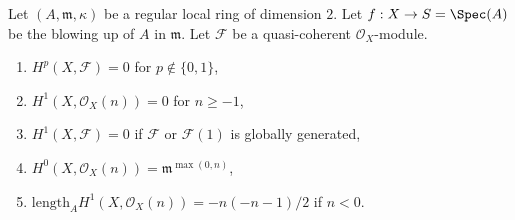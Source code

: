 \begin{lemma}
\label{lemma-cohomology-of-blowup}
Let $(A, \mathfrak m, \kappa)$ be a regular local ring of dimension $2$.
Let $f : X \to S = \Spec(A)$ be the blowing up of $A$ in $\mathfrak m$.
Let $\mathcal{F}$ be a quasi-coherent $\mathcal{O}_X$-module.
\begin{enumerate}
\item $H^p(X, \mathcal{F}) = 0$ for $p \not \in \{0, 1\}$,
\item $H^1(X, \mathcal{O}_X(n)) = 0$ for $n \geq -1$,
\item $H^1(X, \mathcal{F}) = 0$ if $\mathcal{F}$ or $\mathcal{F}(1)$
is globally generated,
\item $H^0(X, \mathcal{O}_X(n)) = \mathfrak m^{\max(0, n)}$,
\item $\text{length}_A H^1(X, \mathcal{O}_X(n)) = -n(-n - 1)/2$
if $n < 0$.
\end{enumerate}
\end{lemma}


